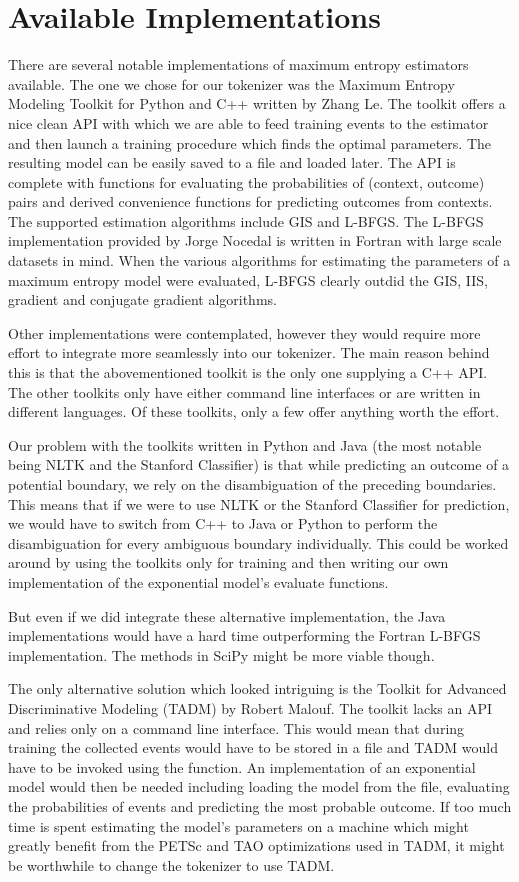 \section{Available Implementations}
\label{sec:maxent-impl}

There are several notable implementations of maximum entropy estimators
available. The one we chose for our tokenizer was the Maximum Entropy Modeling
Toolkit for Python and C++ written by Zhang Le. The toolkit offers a nice clean
API with which we are able to feed training events to the estimator and then
launch a training procedure which finds the optimal parameters. The resulting
model can be easily saved to a file and loaded later. The API is complete with
functions for evaluating the probabilities of (context, outcome) pairs and
derived convenience functions for predicting outcomes from contexts. The
supported estimation algorithms include GIS and L-BFGS. The L-BFGS
implementation provided by Jorge Nocedal is written in Fortran with large scale
datasets in mind. When the various algorithms for estimating the parameters of
a maximum entropy model were evaluated, L-BFGS clearly outdid the GIS, IIS,
gradient and conjugate gradient algorithms.

Other implementations were contemplated, however they would require more effort
to integrate more seamlessly into our tokenizer. The main reason behind this is
that the abovementioned toolkit is the only one supplying a C++ API. The other
toolkits only have either command line interfaces or are written in different
languages. Of these toolkits, only a few offer anything worth the effort.

Our problem with the toolkits written in Python and Java (the most notable
being NLTK and the Stanford Classifier) is that while predicting an outcome of
a potential boundary, we rely on the disambiguation of the preceding
boundaries. This means that if we were to use NLTK or the Stanford Classifier
for prediction, we would have to switch from C++ to Java or Python to perform
the disambiguation for every ambiguous boundary individually. This could be
worked around by using the toolkits only for training and then writing our own
implementation of the exponential model's evaluate functions.

But even if we did integrate these alternative implementation, the Java
implementations would have a hard time outperforming the Fortran L-BFGS
implementation. The methods in SciPy might be more viable though.

The only alternative solution which looked intriguing is the Toolkit for
Advanced Discriminative Modeling (TADM) by Robert Malouf. The toolkit lacks an
API and relies only on a command line interface. This would mean that during
training the collected events would have to be stored in a file and TADM would
have to be invoked using the  function. An implementation of
an exponential model would then be needed including loading the model from the
file, evaluating the probabilities of events and predicting the most probable
outcome. If too much time is spent estimating the model's parameters on a
machine which might greatly benefit from the PETSc and TAO optimizations used
in TADM, it might be worthwhile to change the tokenizer to use TADM.


